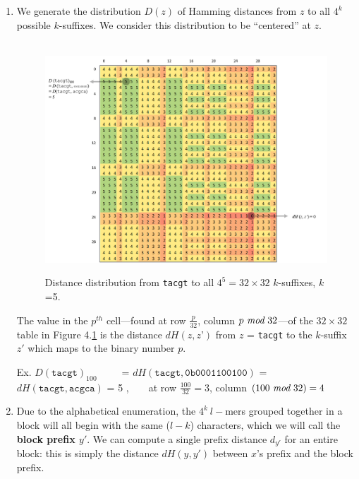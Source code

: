 \documentclass[oneside,12pt]{DISCSthesis}
\begin{document}
{\begin{enumerate}
			\item We generate the distribution $D(z)$ of Hamming distances from $z$ to all $4^{k}$ possible $k$-suffixes. We consider this distribution to be ``centered'' at $z$.

				\begin{figure}[h] \label{fig:D_tacgt}
					\
					\includegraphics[width=6.0in]{img/D(tacgt)_marked_2}
					\caption{Distance distribution from \texttt{tacgt} to all $4^{5} = 32 \times 32$ $k$-suffixes, $k$=5.}
					\end{figure}

			The value in the $p^{th}$ cell---found at row $\frac{p}{32}$, column $p\ \emph{mod}\ 32$---of the $32 \times 32$ table in Figure 4.\ref{fig:D_tacgt} is the distance $dH (z, z’)$ from $z$ = \texttt{tacgt} to the $k$-suffix $z'$ which maps to the binary number $p$.

				{\small\hspace*{40pt}Ex. $D(\texttt{tacgt})_{100}$\ \ \ \ \ = $dH(\texttt{tacgt}, \texttt{0b0001100100})$
				\newline\hspace*{137pt} = $dH(\texttt{tacgt}, \texttt{acgca})$
				\newline\hspace*{137pt} = 5 ,\ \ \ \ at row $\frac{100}{32} = 3$, column $(100\ \emph{mod}\ 32) = 4$
				}\newline

			\item Due to the alphabetical enumeration, the $4^k\ l-$mers grouped together in a block will all begin with the same ($l - k$) characters, which we will call the {\bf\boldmath block prefix $y'$}. We can compute a single prefix distance $d_{y'}$ for an entire block: this is simply the distance $dH(y, y')$ between $x$'s prefix and the block prefix.


\end{enumerate}}
\end{document}
